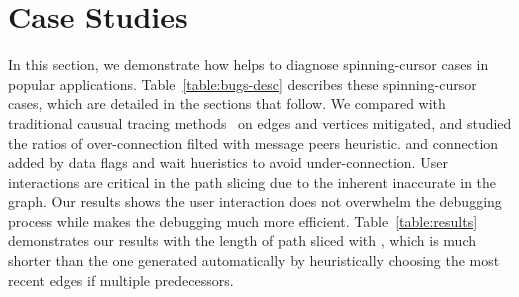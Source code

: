 \section{Case Studies}\label{sec:casestudy}

In this section, we demonstrate how \xxx helps to diagnose \nbug spinning-cursor
cases in \napps popular applications. Table~\ref{table:bugs-desc} describes
these spinning-cursor cases, which are detailed in the sections that follow.
We compared \xxx with traditional causual tracing methods~\cite{XXXX} on edges
and vertices \xxx mitigated, and studied the ratios of over-connection filted
with message peers heuristic. and connection added by data flags and wait
hueristics to avoid under-connection. User interactions are critical in the path
slicing due to the inherent inaccurate in the graph. Our results shows the user
interaction does not overwhelm the debugging process while makes the debugging
much more efficient. Table~\ref{table:results} demonstrates our results with the
length of path sliced with \xxx, which is much shorter than the one generated
automatically by heuristically choosing the most recent edges if multiple
predecessors.







